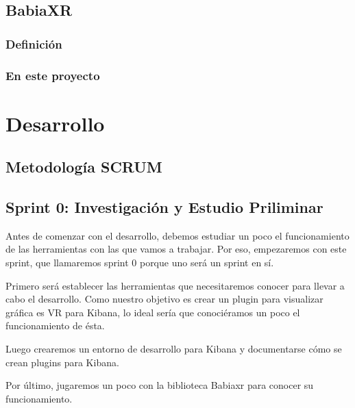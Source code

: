 \documentclass[a4paper, 12pt]{book}
\begin{document}

\section{BabiaXR}
\label{sec:babiaxr}
\subsection{Definici\'on}
\subsection{En este proyecto}


\cleardoublepage
\chapter{Desarrollo}
\label{sec:desarrollo} 


\section{Metodolog\'ia SCRUM}
\label{sec:scrum}


\section{Sprint 0: Investigación y Estudio Priliminar }
\label{sec:sprint0}

Antes de comenzar con el desarrollo, debemos estudiar un poco el funcionamiento de las herramientas con las que vamos a trabajar. Por eso, empezaremos con este sprint, que llamaremos sprint 0 porque uno será un sprint en sí. 

Primero será establecer las herramientas que necesitaremos conocer para llevar a cabo el desarrollo. Como nuestro objetivo es crear un plugin para visualizar gráfica es VR para Kibana, lo ideal sería que conociéramos un poco el funcionamiento de ésta. 

Luego crearemos un entorno de desarrollo para Kibana y documentarse cómo se crean plugins para Kibana.

Por último, jugaremos un poco con la biblioteca Babiaxr para conocer su funcionamiento.
\end{document}
